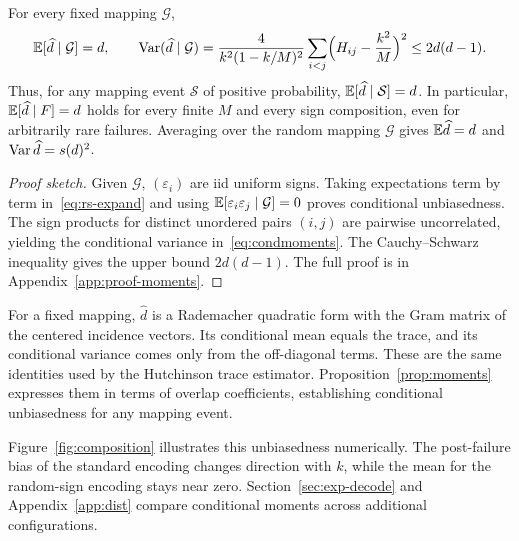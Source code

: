 \begin{proposition}\label{prop:moments}
For every fixed mapping $\mathcal G$,
\begin{equation}
\mathbb E[\widehat d\mid\mathcal G]=d,\qquad
\operatorname{Var}(\widehat d\mid\mathcal G)=\frac{4}{k^2(1-k/M)^2}\sum_{i<j}\Bigl(H_{ij}-\frac{k^2}{M}\Bigr)^2\le2d(d-1).\label{eq:condmoments}
\end{equation}
Thus, for any mapping event $\mathcal S$ of positive probability, $\mathbb E[\widehat d\mid\mathcal S]=d$. In particular, $\mathbb E[\widehat d\mid F]=d$ holds for every finite $M$ and every sign composition, even for arbitrarily rare failures. Averaging over the random mapping $\mathcal G$ gives $\mathbb E\widehat d=d$ and $\operatorname{Var}\widehat d=s(d)^2$.
\end{proposition}

\begin{proof}[Proof sketch]
Given $\mathcal G$, $(\varepsilon_i)$ are iid uniform signs. Taking expectations term by term in~\eqref{eq:rs-expand} and using $\mathbb E[\varepsilon_i\varepsilon_j\mid\mathcal G]=0$ proves conditional unbiasedness. The sign products for distinct unordered pairs $(i,j)$ are pairwise uncorrelated, yielding the conditional variance in~\eqref{eq:condmoments}. The Cauchy--Schwarz inequality gives the upper bound $2d(d-1)$. The full proof is in Appendix~\ref{app:proof-moments}.
\end{proof}

For a fixed mapping, $\widehat d$ is a Rademacher quadratic form with the Gram matrix of the centered incidence vectors. Its conditional mean equals the trace, and its conditional variance comes only from the off-diagonal terms. These are the same identities used by the Hutchinson trace estimator\cite{hutchinson1990trace}. Proposition~\ref{prop:moments} expresses them in terms of overlap coefficients, establishing conditional unbiasedness for any mapping event.

Figure~\ref{fig:composition} illustrates this unbiasedness numerically. The post-failure bias of the standard encoding changes direction with $k$, while the mean for the random-sign encoding stays near zero. Section~\ref{sec:exp-decode} and Appendix~\ref{app:dist} compare conditional moments across additional configurations.

